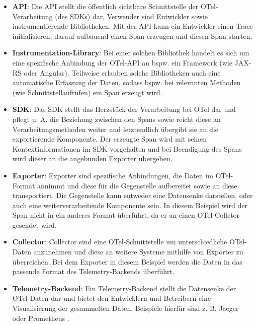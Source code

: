 \begin{itemize}
	\item \textbf{API}: Die API stellt die öffentlich sichtbare Schnittstelle der OTel-Verarbeitung (des SDKs) dar, Verwender sind Entwickler sowie instrumentierende Bibliotheken. Mit der API kann ein Entwickler einen Trace initialisieren, darauf aufbauend einen Span erzeugen und diesen Span starten.
	\item \textbf{Instrumentation-Library}: Bei einer solchen Bibliothek handelt es sich um eine spezifische Anbindung der OTel-API an bspw. ein Framework (wie JAX-RS oder Angular). Teilweise erlauben solche Bibliotheken auch eine automatische Erfassung der Daten, sodass bspw. bei relevanten Methoden (wie Schnittstellaufrufen) ein Span erzeugt wird.
	\item \textbf{SDK}: Das SDK stellt das Herzstück der Verarbeitung bei OTel dar und pflegt u. A. die Beziehung zwischen den Spans sowie reicht diese an Verarbeitungsmethoden weiter und letztendlich übergibt sie an die exportierende Komponente. Der erzeugte Span wird mit seinen Kontextinformationen im SDK vorgehalten und bei Beendigung des Spans wird dieser an die angebunden Exporter übergeben.
	\item \textbf{Exporter}: Exporter sind spezifische Anbindungen, die Daten im OTel-Format annimmt und diese für die Gegenstelle aufbereitet sowie an diese transportiert. Die Gegenstelle kann entweder eine Datensenke darstellen, oder auch eine weiterverarbeitende Komponente sein. In diesem Beispiel wird der Span nicht in ein anderes Format überführt, da er an einen OTel-Colletor gesendet wird.
	\item \textbf{Collector}: Collector sind eine OTel-Schnittstelle um unterschiedliche OTel-Daten anzunehmen und diese an weitere Systeme mithilfe von Exporter zu überreichen. Bei dem Exporter in diesem Beispiel werden die Daten in das passende Format des Telemetry-Backends überführt.
	\item \textbf{Telemetry-Backend}: Ein Telemetry-Backend stellt die Datensenke der OTel-Daten dar und bietet den Entwicklern und Betreibern eine Visualisierung der gesammelten Daten. Beispiele hierfür sind z. B. Jaeger \cite{Jaeger} oder Prometheus \cite{Prometheus}.
\end{itemize}
 
